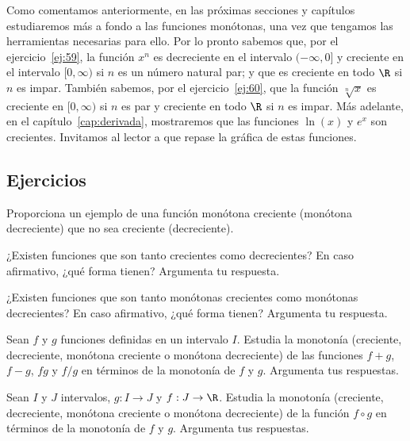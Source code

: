 \documentclass[12pt,a4paper]{book}
\begin{document}
    Como comentamos anteriormente, en las próximas secciones y capítulos
    estudiaremos más a fondo a las funciones monótonas, una vez que tengamos
    las herramientas necesarias para ello. Por lo pronto sabemos que, por el
    ejercicio~\ref{ej:59}, la función $x^{n}$ es decreciente en el intervalo $(-\infty,0]$ y creciente
    en el intervalo $[0,\infty)$ si $n$ es un número natural par; y que es creciente en
    todo $\R$ si $n$ es impar. También sabemos, por el ejercicio~\ref{ej:60}, que la función
    $\sqrt[n]{x}$ es creciente en $[0,\infty)$ si $n$ es par y creciente en todo $\R$ si $n$ es impar.
    Más adelante, en el capítulo~\ref{cap:derivada}, mostraremos que las funciones $\ln(x)$ y $e^{x}$ son
    crecientes. Invitamos al lector a que repase la gráfica de estas funciones.

    \par{}\subsection*{Ejercicios}

    \begin{ejercicio}\label{ej:103}
        Proporciona un ejemplo de una función monótona creciente
        (monótona decreciente) que no sea creciente (decreciente).
    \end{ejercicio}

    \begin{ejercicio}\label{ej:104}
        ¿Existen funciones que son tanto crecientes como decrecientes?
        En caso afirmativo, ¿qué forma tienen? Argumenta tu respuesta.
    \end{ejercicio}

    \begin{ejercicio}\label{ej:105}
        ¿Existen funciones que son tanto monótonas crecientes como
        monótonas decrecientes? En caso afirmativo, ¿qué forma tienen? Argumenta
        tu respuesta.
    \end{ejercicio}

    \begin{ejercicio}\label{ej:106}
        Sean $f$ y $g$ funciones definidas en un intervalo $I$. Estudia la
        monotonía (creciente, decreciente, monótona creciente o monótona decreciente)
        de las funciones $f+g$, $f-g$, $fg$ y $f/g$ en términos de la monotonía de $f$
        y $g$. Argumenta tus respuestas.
    \end{ejercicio}

    \begin{ejercicio}\label{ej:107}
        Sean $I$ y $J$ intervalos, $g:I\to J$ y $f:J\to\R$. Estudia la
        monotonía (creciente, decreciente, monótona creciente o monótona decreciente)
        de la función $f\circ g$ en términos de la monotonía de $f$ y $g$. Argumenta tus
        respuestas.
    \end{ejercicio}
\end{document}
